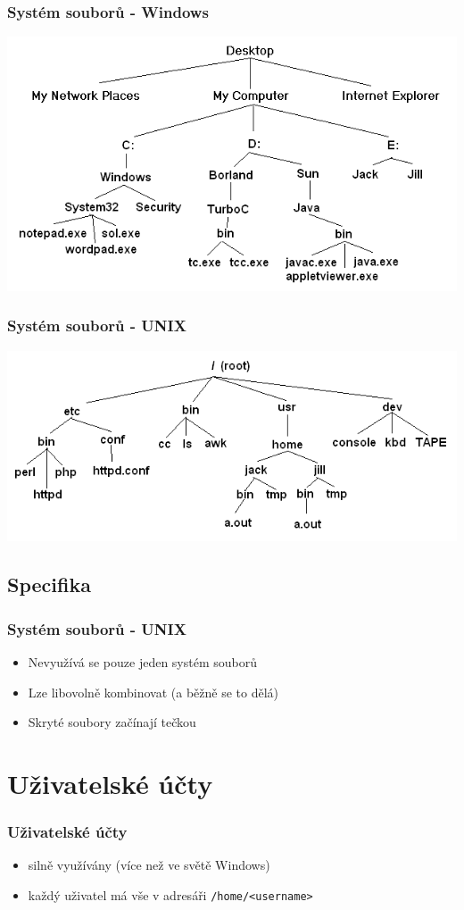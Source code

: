 \documentclass[xetex]{beamer}
\begin{document}
\begin{frame}
  \frametitle{Systém souborů - Windows}
  \includegraphics[scale=0.5]{pic/winfs.png}
\end{frame}	

\begin{frame}
  \frametitle{Systém souborů - UNIX}
  \includegraphics[scale=0.5]{pic/unixfs.png}
\end{frame}	

\subsection{Specifika}
\begin{frame}
  \frametitle{Systém souborů - UNIX}
  \begin{itemize}
  \item Nevyužívá se pouze jeden systém souborů
  \item Lze libovolně kombinovat (a běžně se to dělá)
  \item Skryté soubory začínají tečkou
 \end{itemize}
\end{frame}	

\section{Uživatelské účty}
\begin{frame}
  \frametitle{Uživatelské účty}
  \begin{itemize}
  \item silně využívány (více než ve světě Windows)
  \item každý uživatel má vše v adresáři \texttt{/home/<username>}
  \end{itemize}
\end{frame}	
\end{document}
